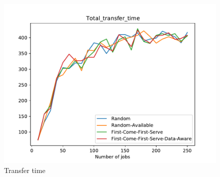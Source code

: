 \documentclass[a4paper]{article}
\begin{document}
\begin{figure}[ht]\includegraphics[scale=1]{MBSS/plot/Total_transfer_time.pdf}\caption{Transfer time}\end{figure}
\end{document}
